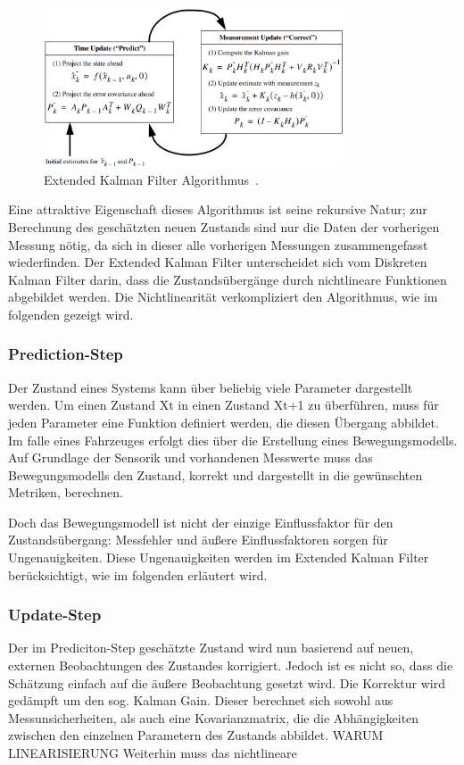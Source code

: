 \documentclass[11pt]{article}
\begin{document}
\begin{figure}[!t]
	\centering
	\includegraphics[width=3.5in]{EKF_algorithm.png}
	\caption{Extended Kalman Filter Algorithmus~\cite{EKF_course}.}
	\label{EKF-Algorithmus}
\end{figure}

Eine attraktive Eigenschaft dieses Algorithmus ist seine rekursive Natur; zur Berechnung des geschätzten neuen Zustands sind nur die Daten der vorherigen Messung nötig, da sich  in dieser alle vorherigen Messungen zusammengefasst wiederfinden. Der Extended Kalman Filter unterscheidet sich vom Diskreten Kalman Filter darin, dass die Zustandsübergänge durch nichtlineare Funktionen abgebildet werden. Die Nichtlinearität verkompliziert den Algorithmus, wie im folgenden gezeigt wird.

\subsubsection{Prediction-Step}
Der Zustand eines Systems kann über beliebig viele Parameter dargestellt werden. Um einen Zustand Xt in einen Zustand Xt+1 zu überführen, muss für jeden Parameter eine Funktion definiert werden, die diesen Übergang abbildet. Im falle eines Fahrzeuges erfolgt dies über die Erstellung eines Bewegungsmodells. Auf Grundlage der Sensorik und vorhandenen Messwerte muss das Bewegungsmodells den Zustand, korrekt und dargestellt in die gewünschten Metriken, berechnen.

Doch das Bewegungsmodell ist nicht der einzige Einflussfaktor für den Zustandsübergang: Messfehler und äußere Einflussfaktoren sorgen für Ungenauigkeiten. Diese Ungenauigkeiten werden im Extended Kalman Filter berücksichtigt, wie im folgenden erläutert wird.

\subsubsection{Update-Step}
Der im Prediciton-Step geschätzte Zustand wird nun basierend auf neuen, externen Beobachtungen des Zustandes korrigiert. Jedoch ist es nicht so, dass die Schätzung einfach auf die äußere Beobachtung gesetzt wird. Die Korrektur wird gedämpft um den sog. Kalman Gain. Dieser berechnet sich sowohl aus Messunsicherheiten, als auch eine Kovarianzmatrix, die die Abhängigkeiten zwischen den einzelnen Parametern des Zustands abbildet. WARUM LINEARISIERUNG Weiterhin muss das nichtlineare 
\end{document}
